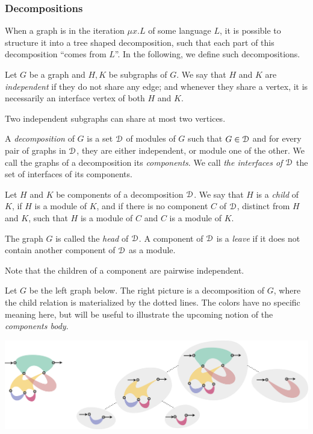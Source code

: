 \subsubsection{Decompositions}

When a graph is in the iteration $\mu x. L$ of some language $L$, it is possible to structure it into a tree shaped decomposition, such that each part of this decomposition ``comes from $L$''. In the following, we define such decompositions.  


\begin{definition} 
Let $G$ be a graph and $H, K$ be subgraphs of $G$.  We say that $H$ and $K$ are \emph{independent} if they do not share any edge; and whenever they share a vertex, it is necessarily an interface vertex of both $H$ and $K$. 
\end{definition}
\begin{remark}
Two independent subgraphs can share at most two vertices.
\end{remark}
\begin{definition}[Decompositions]
A \emph{decomposition} of $G$ is a set $\mathcal D$  of modules of $G$ such that  $G\in \mathcal D$ and for every pair of  graphs in $\mathcal D$, they are either independent, or module one of the other. We call  the graphs of  a decomposition its \emph{components}. We call \emph{the interfaces of $\mathcal D$} the set of interfaces of its components. 
\smallskip

Let $H$ and $K$ be components of a decomposition $\mathcal D$. We say that $H$ is a \emph{child} of $K$, if $H$ is a module of $K$, and if there is no component $C$ of $\mathcal D$, distinct from $H$ and $K$,  such that $H$ is a module of $C$ and $C$ is a module of $K$. 
\smallskip

The graph $G$ is called the \emph{head} of $\mathcal D$. A component of $\mathcal D$ is a \emph{leave} if it does not contain another component of $\mathcal D$ as a module.
 \end{definition}
 \begin{remark} Note that  the children of a component are pairwise independent.
\end{remark}


 \begin{example}\label{example:decomposition} Let $G$ be the left graph below. The right picture is a decomposition of $G$, where the child relation  is materialized by the dotted lines. The colors have no specific meaning here, but will be useful to illustrate the upcoming notion of the \emph{components body}.  
 \begin{center}
\includegraphics[scale=.10]{Pictures/decomposition}
\end{center}
 \end{example}
 
